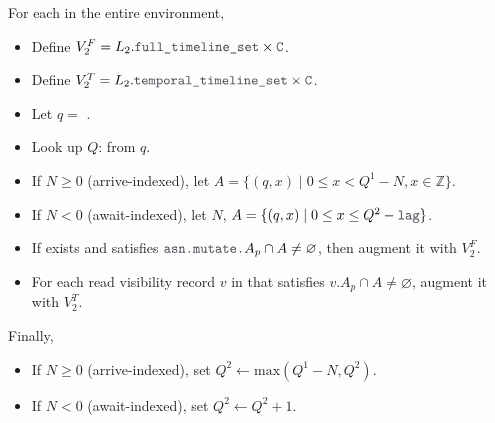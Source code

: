 \filbreak
{} For each  in the entire environment,
\begin{itemize}
  \item Define $V_2^F = L_2.\lighttt{full\_timeline\_set} \times \lighttt{C}$.
  \filbreak
  \item Define $V_2^T = L_2.\lighttt{temporal\_timeline\_set} \times \lighttt{C}$.
  \filbreak
  \item Let $q =$ .
  \filbreak
  \item Look up $Q$:  from $q$.
  \filbreak
  \item If $N \ge 0$ (arrive-indexed), let $A = \{ (q, x) \mid 0 \le x < Q^1 - N, x \in \mathbb{Z} \}$.
  \filbreak
  \item If $N < 0$ (await-indexed), let $N$, $A = \{ (q, x) \mid 0 \le x \le Q^2 - \lighttt{lag} \}$.
  \filbreak
  \item If  exists and satisfies $\lighttt{asn.mutate.}A_p \cap A \ne \varnothing$, then augment it with $V_2^F$.
  \filbreak
  \item For each read visibility record $v$ in  that satisfies $v.A_p \cap A \ne \varnothing$, augment it with $V_2^T$.
\end{itemize}
Finally,
\begin{itemize}
  \item If $N \ge 0$ (arrive-indexed), set $Q^2 \leftarrow \text{max}(Q^1 - N, Q^2)$.
  \item If $N < 0$ (await-indexed), set $Q^2 \leftarrow Q^2 + 1$.
\end{itemize}


